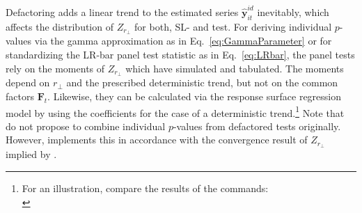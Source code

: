 Defactoring adds a linear trend to the estimated series $ \boldsymbol{\hat{y}}^{i \! d}_{it} $ inevitably, which affects the distribution of $ Z_{r_\perp} $ for both, SL- and \citeauthor{Johansen1988} test. For deriving individual $p$-values via the gamma approximation as in Eq.~\eqref{eq:GammaParameter} or for standardizing the LR-bar panel test statistic as in Eq.~\eqref{eq:LRbar}, the panel tests rely on the moments of $ Z_{r_\perp} $ which \citet[Appendix, Tab.~A.1]{ArsovaOersal2018} have simulated and tabulated. The moments depend on $ r_\perp $ and the prescribed deterministic trend, but not on the common factors $ \boldsymbol{F}_t $. Likewise, they can be calculated via the response surface regression model by \citet{Trenkler2008} using the coefficients for the case of a deterministic trend.\footnote{For an illustration, compare the results of the  commands:\\ }
Note that \citet{ArsovaOersal2017} do not propose to combine individual $p$-values from defactored \citeauthor{Johansen1988} tests originally. However,  implements this in accordance with the convergence result of $ Z_{r_\perp} $ implied by \citet[p.~1041, Th.~3.4]{ArsovaOersal2018}. 


